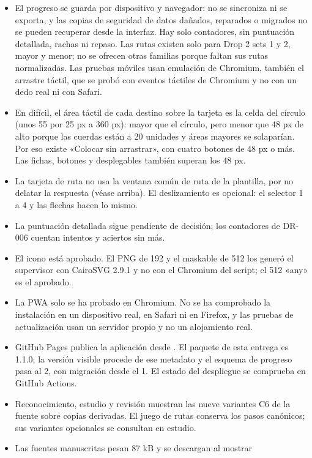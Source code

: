 \documentclass[a4paper,11pt]{article}
\let\originaltexttt\texttt
\renewcommand{\texttt}[1]{\originaltexttt{\seqsplit{#1}}}
\providecommand{\tightlist}{\setlength{\itemsep}{2pt}\setlength{\parskip}{0pt}}
\begin{document}
\begin{itemize}
\tightlist
\item
  El progreso se guarda por dispositivo y navegador: no se sincroniza ni
  se exporta, y las copias de seguridad de datos dañados, reparados o
  migrados no se pueden recuperar desde la interfaz. Hay solo
  contadores, sin puntuación detallada, rachas ni repaso. Las rutas
  existen solo para Drop 2 sets 1 y 2, mayor y menor; no se ofrecen
  otras familias porque faltan sus rutas normalizadas. Las pruebas
  móviles usan emulación de Chromium, también el arrastre táctil, que se
  probó con eventos táctiles de Chromium y no con un dedo real ni con
  Safari.
\item
  En difícil, el área táctil de cada destino sobre la tarjeta es la
  celda del círculo (unos 55 por 25 px a 360 px): mayor que el círculo,
  pero menor que 48 px de alto porque las cuerdas están a 20 unidades y
  áreas mayores se solaparían. Por eso existe «Colocar sin arrastrar»,
  con cuatro botones de 48 px o más. Las fichas, botones y desplegables
  también superan los 48 px.
\item
  La tarjeta de ruta no usa la ventana común de ruta de la plantilla,
  por no delatar la respuesta (véase arriba). El deslizamiento es
  opcional: el selector 1 a 4 y las flechas hacen lo mismo.
\item
  La puntuación detallada sigue pendiente de decisión; los contadores de
  DR-006 cuentan intentos y aciertos sin más.
\item
  El icono está aprobado. El PNG de 192 y el maskable de 512 los generó
  el supervisor con CairoSVG 2.9.1 y no con el Chromium del script; el
  512 «any» es el aprobado.
\item
  La PWA solo se ha probado en Chromium. No se ha comprobado la
  instalación en un dispositivo real, en Safari ni en Firefox, y las
  pruebas de actualización usan un servidor propio y no un alojamiento
  real.
\item
  GitHub Pages publica la aplicación desde \texttt{main}. El paquete de
  esta entrega es 1.1.0; la versión visible procede de ese metadato y el
  esquema de progreso pasa al 2, con migración desde el 1. El estado del
  despliegue se comprueba en GitHub Actions.
\item
  Reconocimiento, estudio y revisión muestran las nueve variantes C6 de
  la fuente sobre copias derivadas. El juego de rutas conserva los pasos
  canónicos; sus variantes opcionales se consultan en estudio.
\item
  Las fuentes manuscritas pesan 87 kB y se descargan al mostrar

\end{itemize}
\end{document}
